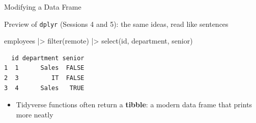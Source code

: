 \documentclass[
  ignorenonframetext,
  aspectratio=169,
]{beamer}
\newenvironment{Shaded}{\begin{snugshade}}{\end{snugshade}}
\newcommand{\CommentTok}[1]{\textcolor[rgb]{0.37,0.37,0.37}{#1}}
\newcommand{\DecValTok}[1]{\textcolor[rgb]{0.68,0.00,0.00}{#1}}
\newcommand{\FunctionTok}[1]{\textcolor[rgb]{0.28,0.35,0.67}{#1}}
\newcommand{\NormalTok}[1]{\textcolor[rgb]{0.00,0.23,0.31}{#1}}
\newcommand{\OtherTok}[1]{\textcolor[rgb]{0.00,0.23,0.31}{#1}}
\newcommand{\SpecialCharTok}[1]{\textcolor[rgb]{0.37,0.37,0.37}{#1}}
\providecommand{\tightlist}{%
  \setlength{\itemsep}{0pt}\setlength{\parskip}{0pt}}\usepackage{longtable,booktabs,array}
\begin{document}
\begin{frame}[fragile]{Modifying a Data Frame}
\protect\hypertarget{modifying-a-data-frame}{}
\begin{Shaded}
\end{Shaded}

Preview of \texttt{dplyr} (Sessions 4 and 5): the same ideas, read like
sentences

\begin{Shaded}
\begin{Highlighting}[]
\NormalTok{employees }\SpecialCharTok{|\textgreater{}}
  \FunctionTok{filter}\NormalTok{(remote) }\SpecialCharTok{|\textgreater{}}
  \FunctionTok{select}\NormalTok{(id, department, senior)}
\end{Highlighting}
\end{Shaded}

\begin{verbatim}
  id department senior
1  1      Sales  FALSE
2  3         IT  FALSE
3  4      Sales   TRUE
\end{verbatim}

\begin{itemize}
\tightlist
\item
  Tidyverse functions often return a \textbf{tibble}: a modern data
  frame that prints more neatly
\end{itemize}
\end{frame}
\end{document}
